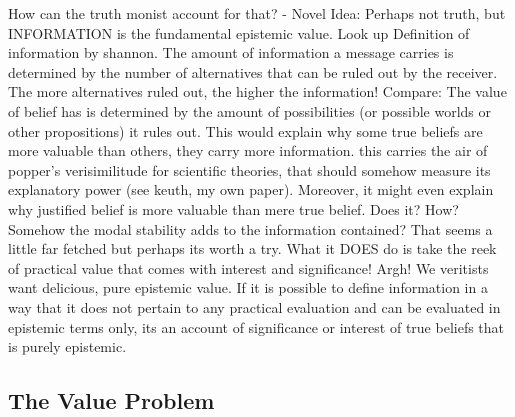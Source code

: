 \documentclass[12pt,numbers=noenddot]{scrartcl}
\begin{document}
    How can the truth monist account for that? - Novel Idea: Perhaps not truth, but INFORMATION is the fundamental epistemic value. Look up Definition of information by shannon. The amount of information a message carries is determined by the number of alternatives that can be ruled out by the receiver. The more alternatives ruled out, the higher the information! Compare: The value of belief has is determined by the amount of possibilities (or possible worlds or other propositions) it rules out. This would explain why some true beliefs are more valuable than others, they carry more information. this carries the air of popper's verisimilitude for scientific theories, that should somehow measure its explanatory power (see keuth, my own paper).
    Moreover, it might even explain why justified belief is more valuable than mere true belief. Does it? How? Somehow the modal stability adds to the information contained? That seems a little far fetched but perhaps its worth a try. 
    What it DOES do is take the reek of practical value that comes with interest and significance! Argh! We veritists want delicious, pure epistemic value. If it is possible to define information in a way that it does not pertain to any practical evaluation and can be evaluated in epistemic terms only, its an account of significance or interest of true beliefs that is purely epistemic.


\subsection{The Value Problem}
\end{document}
